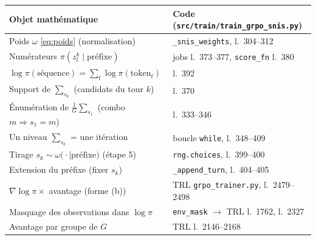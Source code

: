 \documentclass{article}
\newcommand{\w}[2]{\omega\big(#1 \mid #2\big)}       %
\begin{document}
\begin{center}
\begin{tabular}{l l}
\hline
\textbf{Objet mathématique} & \textbf{Code (\texttt{src/train/train\_grpo\_snis.py})} \\
\hline
Poids $\omega$ \eqref{eq:poids} (normalisation) & \texttt{\_snis\_weights}, l.~304--312 \\
Numérateurs $\pi(z^k_l \mid \text{préfixe})$ & jobs l.~373--377, \texttt{score\_fn} l.~380 \\
$\log \pi(\text{séquence}) = \sum_t \log \pi(\text{token}_t)$ & l.~392 \\
Support de $\sum_{s_k}$ (candidats du tour $k$) & l.~370 \\
Énumération de $\frac{1}{G}\sum_{s_1}$ (combo $m \Rightarrow s_1 = m$) & l.~333--346 \\
Un niveau $\sum_{s_k}$ = une itération & boucle \texttt{while}, l.~348--409 \\
Tirage $s_k \sim \w{\cdot}{\text{préfixe}}$ (étape 5) & \texttt{rng.choices}, l.~399--400 \\
Extension du préfixe (fixer $s_k$) & \texttt{\_append\_turn}, l.~404--405 \\
$\nabla \log \pi \times$ avantage (forme (b)) & TRL \texttt{grpo\_trainer.py}, l.~2479--2498 \\
Masquage des observations dans $\log \pi$ & \texttt{env\_mask} $\to$ TRL l.~1762, l.~2327 \\
Avantage par groupe de $G$ & TRL l.~2146--2168 \\
\hline
\end{tabular}
\end{center}
\end{document}

